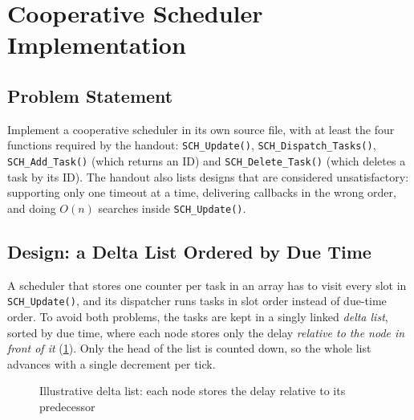 \documentclass[twoside,final]{hcmut-report}
\begin{document}
\section{Cooperative Scheduler Implementation}
\subsection{Problem Statement}
Implement a cooperative scheduler in its own source file, with at least the four functions required by the handout: \texttt{SCH\_Update()}, \texttt{SCH\_Dispatch\_Tasks()}, \texttt{SCH\_Add\_Task()} (which returns an ID) and \texttt{SCH\_Delete\_Task()} (which deletes a task by its ID). The handout also lists designs that are considered unsatisfactory: supporting only one timeout at a time, delivering callbacks in the wrong order, and doing $O(n)$ searches inside \texttt{SCH\_Update()}.

\subsection{Design: a Delta List Ordered by Due Time}
A scheduler that stores one counter per task in an array has to visit every slot in \texttt{SCH\_Update()}, and its dispatcher runs tasks in slot order instead of due-time order. To avoid both problems, the tasks are kept in a singly linked \emph{delta list}, sorted by due time, where each node stores only the delay \emph{relative to the node in front of it} (\cref{fig:delta_list}). Only the head of the list is counted down, so the whole list advances with a single decrement per tick.

\begin{figure}[H]
    \centering
    \caption{Illustrative delta list: each node stores the delay relative to its predecessor}
    \label{fig:delta_list}
\end{figure}
\end{document}

